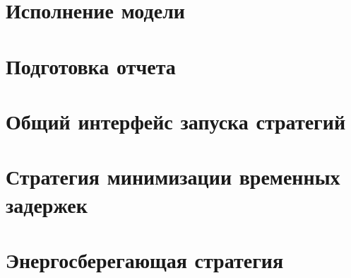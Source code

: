 \begingroup
\captiondelim{ } %

\endgroup

\newpage

\section{Исполнение модели}\label{app:code6}

\begingroup
\captiondelim{ } %

\endgroup

\newpage

\section{Подготовка отчета}\label{app:code7}

\begingroup
\captiondelim{ } %

\endgroup

\newpage

\section{Общий интерфейс запуска стратегий}\label{app:code8}

\begingroup
\captiondelim{ } %

\endgroup

\newpage

\section{Стратегия минимизации временных задержек}\label{app:code9}

\begingroup
\captiondelim{ } %

\endgroup

\newpage

\section{Энергосберегающая стратегия}\label{app:code10}


